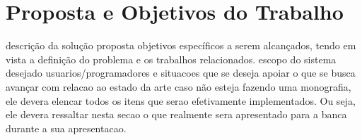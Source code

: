 
\chapter{Proposta e Objetivos do Trabalho}

descrição da solução proposta
objetivos específicos a serem alcançados, tendo em vista a definição do problema e os trabalhos relacionados.
    escopo do sistema desejado
    usuarios/programadores e situacoes que se deseja apoiar
    o que se busca avançar com relacao ao estado da arte
    caso não esteja fazendo uma monografia, ele devera elencar todos os itens que serao efetivamente implementados. Ou seja, ele devera ressaltar nesta secao o que realmente sera apresentado para a banca durante a sua apresentacao.